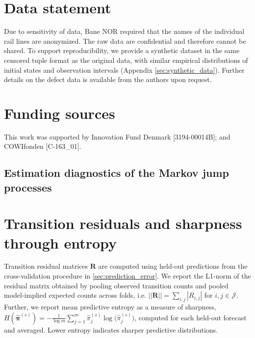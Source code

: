 \documentclass{article}
\begin{document}
\section*{Data statement}
Due to sensitivity of data, Bane NOR required that the names of the individual rail lines are anonymized. The raw data are confidential and therefore cannot be shared. To support reproducibility, we provide a synthetic dataset in the same censored tuple format as the original data, with similar empirical distributions of initial states and observation intervals (Appendix \ref{sec:synthetic_data}). Further details on the defect data is available from the authors upon request.


\section*{Funding sources}
This work was supported by Innovation Fund Denmark [3194-00014B]; and COWIfonden [C-163\_01].

 
\newpage
\appendix


\clearpage
\begin{landscape}

\section{Estimation diagnostics of the Markov jump processes}
\label{sec:diagnostics_estimation}

\begin{table}[h!]
\centering
\caption{Akaike information criterion (AIC; computed from the log-likelihood at the score-optimal parameters) and per-observation gradient norm of the score objective.}
\label{tab:AIC_tab}
\scriptsize

\end{table}

\end{landscape}
\clearpage



\newpage

\section{Transition residuals and sharpness through entropy} \label{sec:transition_L1}  \label{sec:sharpness}
Transition residual matrices  $\bm R$ are computed using held-out predictions from the cross-validation procedure in \cref{sec:prediction_error}.
We report the L1-norm of the residual matrix obtained by pooling observed transition counts and pooled model-implied expected counts across folds, i.e. $|| \bm R || = \sum_{i,j} |  R_{i,j}|$ for $i,j \in \mathcal J$. Further, we report mean predictive entropy as a measure of sharpness,
$H(\widehat{\boldsymbol\pi}^{(s)}) = - \frac{1}{\log m}\sum_{j=1}^{m}\widehat{\pi}^{(s)}_j \log\!\big(\widehat{\pi}^{(s)}_j\big)$,
computed for each held-out forecast and averaged. Lower entropy indicates sharper predictive distributions.
\end{document}
